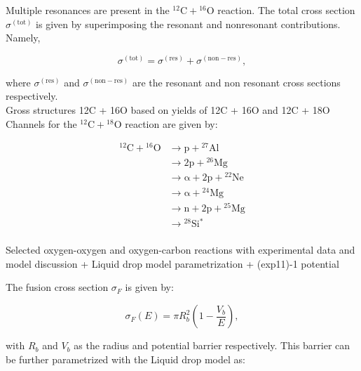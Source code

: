\documentclass[openany]{book}
\begin{document}
Multiple resonances are present in the $\mathrm{{}^{12}C + {}^{16}O}$ reaction. The total cross section $\sigma^{(\mathrm{tot})}$ is given by superimposing the resonant and nonresonant contributions. Namely, 

\begin{equation}\label{eq:middleFusion_sumResonantNonResonant}
	\sigma^{(\mathrm{tot})} = \sigma^{(\mathrm{res})} + \sigma^{(\mathrm{non-res})},
\end{equation}

where $\sigma^{(\mathrm{res})}$ and $\sigma^{(\mathrm{non-res})}$ are the resonant and non resonant cross sections respectively. \\

Gross structures 12C + 16O based on yields of 12C + 16O and 12C + 18O \cite{chan_bohn_vandenbosch_sielemann_cramer_bernhardt_bhang_chiang_1979} \\

Channels for the $\mathrm{{}^{12}C + {}^{18}O}$ reaction are given by:

\begin{equation}\label{eq:middleFusion_experimental_12C18O_channels}
	\begin{split}
		\mathrm{{}^{12}C + {}^{16}O} &\rightarrow \mathrm{p + {}^{27}Al} \\
		&\rightarrow \mathrm{2p + {}^{26}Mg} \\
		&\rightarrow \mathrm{\alpha + 2p + {}^{22}Ne} \\
		&\rightarrow \mathrm{\alpha  + {}^{24}Mg} \\
		&\rightarrow \mathrm{n + 2p + {}^{25}Mg} \\
		&\rightarrow \mathrm{{}^{28}Si^{*}} \\
	\end{split}
\end{equation}

Selected oxygen-oxygen and oxygen-carbon reactions with experimental data and model discussion + Liquid drop model parametrization + (exp11)-1 potential  \cite{kovar_geesaman_braid_eisen_henning_ophel_paul_rehm_sanders_sperr_et_1979}

The fusion cross section $\sigma_F$ is given by:
 
\begin{equation}\label{eq:middleFusion_empirical_crossSection_Parametrized}
	\sigma_F(E) = \pi R_b^2 \left(1 - \frac{V_b}{E}\right),
\end{equation}

with $R_b$ and $V_b$ as the radius and potential barrier respectively. This barrier can be further parametrized with the Liquid drop model as: 
\end{document}
